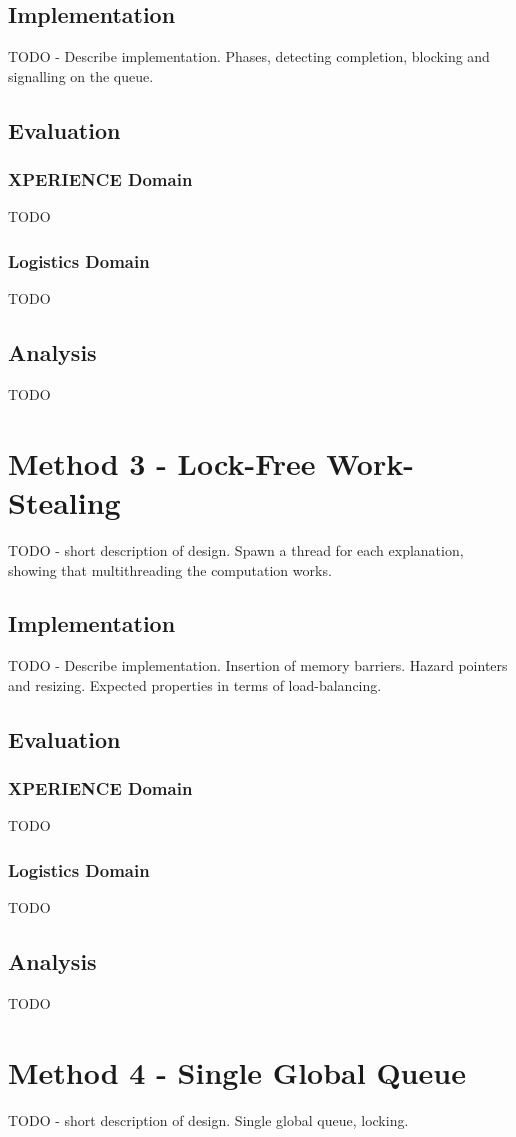 \documentclass[12pt,twoside,abbrevs,msc,ai,notimes,logo,sansheadings]{infthesis}
\begin{document}
  \section {Implementation}
  TODO - Describe implementation. Phases, detecting completion, blocking and signalling on the queue.
  \section{Evaluation}
  \subsection{XPERIENCE Domain}
  TODO
  \subsection{Logistics Domain}
  TODO
  \section{Analysis}
  TODO
  \chapter {Method 3 - Lock-Free Work-Stealing}
  TODO - short description of design. Spawn a thread for each explanation, showing that multithreading the computation works.
  \section {Implementation}
  TODO - Describe implementation. Insertion of memory barriers. Hazard pointers and resizing. Expected properties in terms of load-balancing.
  \section{Evaluation}
  \subsection{XPERIENCE Domain}
  TODO
  \subsection{Logistics Domain}
  TODO
  \section{Analysis}
  TODO
  \chapter {Method 4 - Single Global Queue}
  TODO - short description of design. Single global queue, locking.
\end{document}
